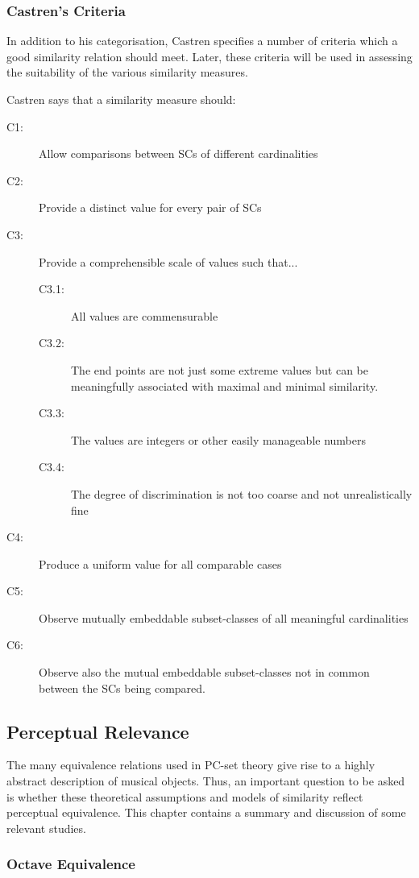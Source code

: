 \documentclass{article}
\begin{document}
\subsubsection{Castren's Criteria}
\label{sec-3-4-3}

In addition to his categorisation, Castren specifies a number of
criteria which a good similarity relation should meet. Later, these
criteria will be used in assessing the suitability of the various
similarity measures.

Castren says that a similarity measure should:
\begin{description}
\item[C1:] Allow comparisons between SCs of different cardinalities
\item[C2:] Provide a distinct value for every pair of SCs
\item[C3:] Provide a comprehensible scale of values such that...
\begin{description}
\item[C3.1:] All values are commensurable
\item[C3.2:] The end points are not just some extreme values but can be meaningfully associated with maximal and minimal similarity.
\item[C3.3:] The values are integers or other easily manageable numbers
\item[C3.4:] The degree of discrimination is not too coarse and not unrealistically fine
\end{description}
\item[C4:] Produce a uniform value for all comparable cases
\item[C5:] Observe mutually embeddable subset-classes of all meaningful cardinalities
\item[C6:] Observe also the mutual embeddable subset-classes not in common between the SCs being compared.
\end{description}
\subsection{Perceptual Relevance}
\label{sec-3-5}

The many equivalence relations used in PC-set theory give rise to a
highly abstract description of musical objects. Thus, an important
question to be asked is whether these theoretical assumptions and
models of similarity reflect perceptual equivalence. This chapter
contains a summary and discussion of some relevant studies.
\subsubsection{Octave Equivalence}
\label{sec-3-5-1}
\end{document}

